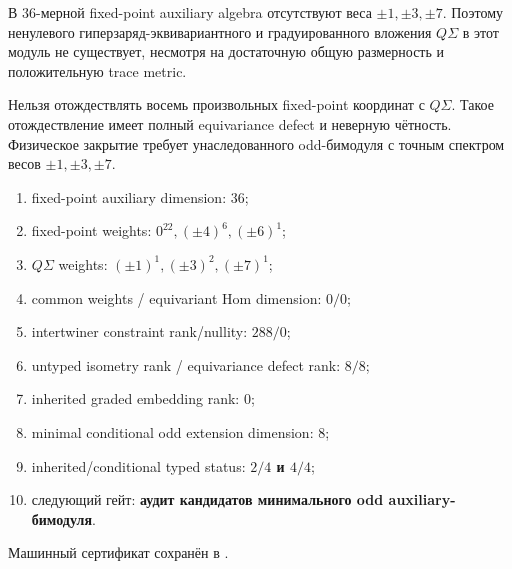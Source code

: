 \begin{theorem}
В $36$-мерной fixed-point auxiliary algebra отсутствуют веса
$\pm1,\pm3,\pm7$. Поэтому ненулевого гиперзаряд-эквивариантного и
градуированного вложения $Q\Sigma$ в этот модуль не существует, несмотря
на достаточную общую размерность и положительную trace metric.
\end{theorem}

\begin{nogocriterion}
Нельзя отождествлять восемь произвольных fixed-point координат с
$Q\Sigma$. Такое отождествление имеет полный equivariance defect и неверную
чётность. Физическое закрытие требует унаследованного odd-бимодуля с точным
спектром весов $\pm1,\pm3,\pm7$.
\end{nogocriterion}

\begin{protocol}\begin{enumerate}
\item fixed-point auxiliary dimension: \textbf{$36$};
\item fixed-point weights: \textbf{$0^{22},(\pm4)^6,(\pm6)^1$};
\item $Q\Sigma$ weights: \textbf{$(\pm1)^1,(\pm3)^2,(\pm7)^1$};
\item common weights / equivariant Hom dimension: \textbf{$0/0$};
\item intertwiner constraint rank/nullity: \textbf{$288/0$};
\item untyped isometry rank / equivariance defect rank: \textbf{$8/8$};
\item inherited graded embedding rank: \textbf{$0$};
\item minimal conditional odd extension dimension: \textbf{$8$};
\item inherited/conditional typed status: \textbf{$2/4$ и $4/4$};
\item следующий гейт: \textbf{аудит кандидатов минимального odd auxiliary-бимодуля}.
\end{enumerate}\end{protocol}

Машинный сертификат сохранён в
.